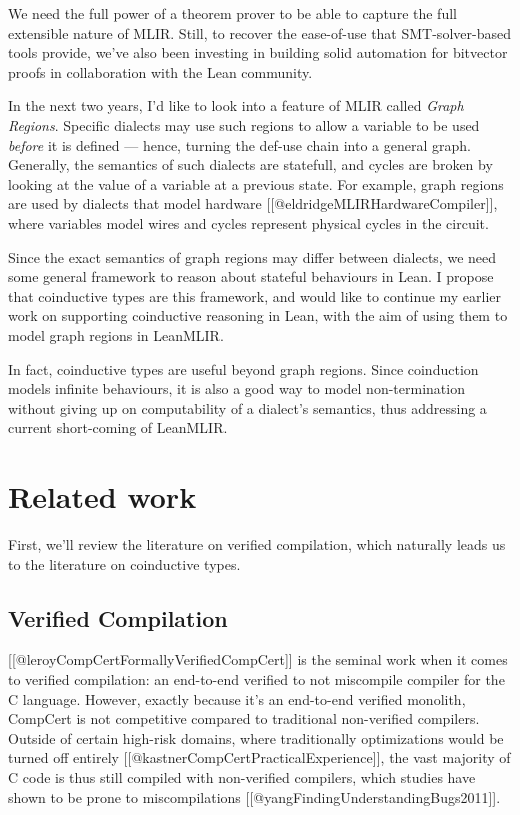 We need the full power of a theorem prover to be able to capture the
full extensible nature of MLIR. Still, to recover the ease-of-use that
SMT-solver-based tools provide, we've also been investing in building
solid automation for bitvector proofs in collaboration with the Lean
community.

In the next two years, I'd like to look into a feature of MLIR called
\emph{Graph Regions}. Specific dialects may use such regions to allow a
variable to be used \emph{before} it is defined --- hence, turning the
def-use chain into a general graph. Generally, the semantics of such
dialects are statefull, and cycles are broken by looking at the value of
a variable at a previous state. For example, graph regions are used by
dialects that model hardware {[}{[}@eldridgeMLIRHardwareCompiler{]}{]},
where variables model wires and cycles represent physical cycles in the
circuit.

Since the exact semantics of graph regions may differ between dialects,
we need some general framework to reason about stateful behaviours in
Lean. I propose that coinductive types are this framework, and would
like to continue my earlier work on supporting coinductive reasoning in
Lean, with the aim of using them to model graph regions in LeanMLIR.

In fact, coinductive types are useful beyond graph regions. Since
coinduction models infinite behaviours, it is also a good way to model
non-termination without giving up on computability of a dialect's
semantics, thus addressing a current short-coming of LeanMLIR.

\hypertarget{related-work}{%
\section{Related work}\label{related-work}}

First, we'll review the literature on verified compilation, which
naturally leads us to the literature on coinductive types.

\hypertarget{verified-compilation}{%
\subsection{Verified Compilation}\label{verified-compilation}}

{[}{[}@leroyCompCertFormallyVerified\textbar CompCert{]}{]} is the
seminal work when it comes to verified compilation: an end-to-end
verified to not miscompile compiler for the C language. However, exactly
because it's an end-to-end verified monolith, CompCert is not
competitive compared to traditional non-verified compilers. Outside of
certain high-risk domains, where traditionally optimizations would be
turned off entirely {[}{[}@kastnerCompCertPracticalExperience{]}{]}, the
vast majority of C code is thus still compiled with non-verified
compilers, which studies have shown to be prone to miscompilations
{[}{[}@yangFindingUnderstandingBugs2011{]}{]}.

